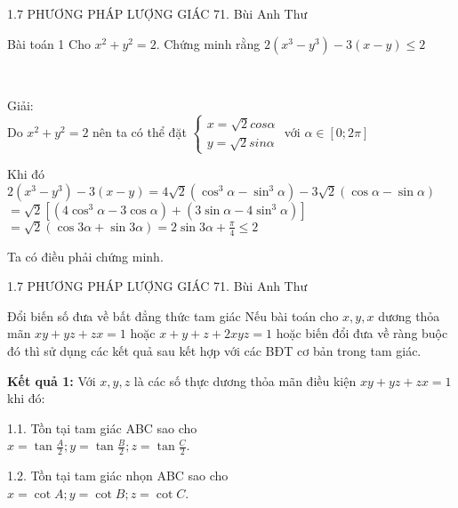 \begin{frame}{1.7 PHƯƠNG PHÁP LƯỢNG GIÁC \hspace{3cm}  71. Bùi Anh Thư} 
\begin{block}{Bài toán 1}
Cho $x^2+y^2=2$. Chứng minh rằng $2(x^3-y^3)-3(x-y)\leq 2$\\
\end{block} \\
\pause
\vspace{0,2cm}

Giải:\\
Do $x^2+y^2=2$ nên ta có thể đặt $\left\{
    \begin{array}{cc}
        x=\sqrt{2}cos\alpha\\
        y=\sqrt{2}sin\alpha
    \end{array}
    \right.$ với $\alpha\in[0;2\pi]$\\
    \vspace{0,4cm}
    
    Khi đó $2(x^3-y^3)-3(x-y)=4\sqrt{2}(\cos^3{\alpha}-\sin^3{\alpha})-3\sqrt{2}(\cos{\alpha}-\sin{\alpha})$\\
    \vspace{0,4cm}
    $=\sqrt{2}[(4\cos^3{\alpha}-3\cos{\alpha})+(3\sin{\alpha}-4\sin^3{\alpha})]$\\
    \vspace{0,4cm}
    $=\sqrt{2}(\cos{3\alpha}+\sin{3\alpha})=2\sin{3\alpha+\frac{\pi}{4}}\leq 2$\\
    \vspace{0,4cm}
    
    Ta có điều phải chứng minh.
      \end{frame}
    

 \begin{frame}{1.7 PHƯƠNG PHÁP LƯỢNG GIÁC \hspace{3cm}  71. Bùi Anh Thư}  
\begin{block}{Đổi biến số đưa về bất đẳng thức tam giác}
   Nếu bài toán cho $x,y,x$ dương thỏa mãn $xy+yz+zx=1$ hoặc $x+y+z+2xyz=1$ hoặc biến đổi đưa về ràng buộc đó thì sử dụng các kết quả sau kết hợp với các BĐT cơ bản trong tam giác.\\
   \vspace{0,4cm}
   
   \textbf{Kết quả 1:} Với $x,y,z$ là các số thực dương thỏa mãn điều kiện $xy+yz+zx=1$ khi đó:\\
   \vspace{0,4cm}
   
   1.1. Tồn tại tam giác ABC sao cho\\
   $x=\tan \frac{A}{2}; y=\tan \frac{B}{2}; z= \tan \frac{C}{2}$.\\
   \vspace{0,4cm}
   
   1.2. Tồn tại tam giác nhọn ABC sao cho\\
   $x=\cot{A}; y=\cot{B}; z=\cot{C}$.\\
\end{block} 
\end{frame}
   
